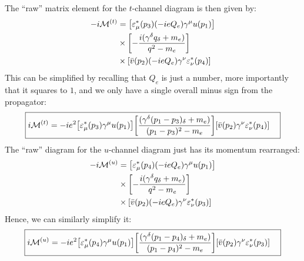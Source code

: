 \documentclass[12pt]{article}
\newcommand{\M}{\mathcal{M}}
\newcommand{\veps}{\varepsilon}
\begin{document}
The ``raw'' matrix element for the $t$-channel diagram is then given by:
\begin{align*}
  -i\M^{(t)}&=\qty[\veps^*_\mu(p_3)(-ieQ_e)\gamma^\mu u(p_1)]\\
  &\times\qty[-\frac{i(\gamma^\delta q_\delta+m_e)}{q^2-m_e}]\\
  &\times\qty[\bar{v}(p_2)(-ieQ_e)\gamma^\nu \veps^*_\nu(p_4)]
\end{align*}
This can be simplified by recalling that $Q_e$ is just a number, more importantly that it squares to $1$, and we only have a single overall minus sign from the propagator:
\begin{equation}
  \label{eq:p7a}
  \boxed{
    \begin{aligned}
      i\M^{(t)}&=-ie^2\qty[\veps^*_\mu(p_3)\gamma^\mu u(p_1)]
      \qty[\frac{(\gamma^\delta(p_1-p_3)_\delta+m_e)}{(p_1-p_3)^2-m_e}]
      \qty[\bar{v}(p_2)\gamma^\nu \veps^*_\nu(p_4)]
    \end{aligned}
  }
\end{equation}
The ``raw'' diagram for the $u$-channel diagram just has its momentum rearranged:
\begin{align*}
  -i\M^{(u)}&=\qty[\veps^*_\mu(p_4)(-ieQ_e)\gamma^\mu u(p_1)]\\
  &\times\qty[-\frac{i(\gamma^\delta q_\delta+m_e)}{q^2-m_e}]\\
  &\times\qty[\bar{v}(p_2)(-ieQ_e)\gamma^\nu \veps^*_\nu(p_3)]
\end{align*}
Hence, we can similarly simplify it:
\begin{equation}
  \label{eq:p7b}
  \boxed{
    \begin{aligned}
      i\M^{(u)}&=-ie^2\qty[\veps^*_\mu(p_4)\gamma^\mu u(p_1)]
      \qty[\frac{(\gamma^\delta(p_1-p_4)_\delta+m_e)}{(p_1-p_4)^2-m_e}]
      \qty[\bar{v}(p_2)\gamma^\nu \veps^*_\nu(p_3)]
    \end{aligned}
  }
\end{equation}
\newpage
\end{document}
